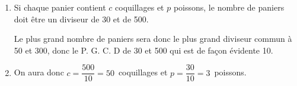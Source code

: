 
\medskip

%
%
%
%
%
%

\begin{enumerate}
\item %
Si chaque panier contient $c$ coquillages et $p$ poissons, le nombre de paniers doit être un diviseur de 30 et de 500.

Le plus grand nombre de paniers sera donc le plus grand diviseur commun à 50 et 300, donc le P. G. C. D de 30 et 500 qui est de façon évidente 10.
\item %
On aura donc $c = \dfrac{500}{10} = 50$~coquillages  et $p = \dfrac{30}{10} = 3$~poissons.
\end{enumerate}

\vspace{0,5cm}

